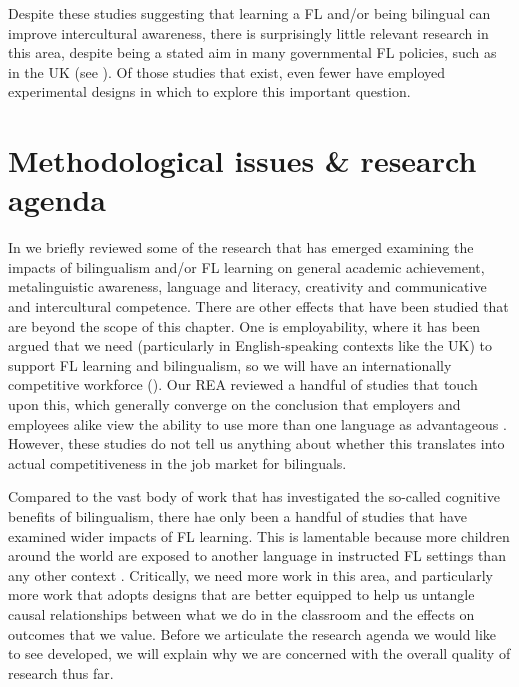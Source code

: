 \documentclass[output=paper]{langscibook}
\begin{document}
Despite these studies suggesting that learning a FL and/or being bilingual can improve intercultural awareness, there is surprisingly little relevant research in this area, despite being a stated aim in many governmental FL policies, such as in the UK (see \citealt{DfE2013curriculum}). Of those studies that exist, even fewer have employed experimental designs in which to explore this important question. 

\section{Methodological issues \& research agenda}

In  we briefly reviewed some of the research that has emerged examining the impacts of bilingualism and/or FL learning on general academic achievement, metalinguistic awareness, language and literacy, creativity and communicative and intercultural competence. There are other effects that have been studied that are beyond the scope of this chapter. One is employability, where it has been argued that we need (particularly in English-speaking contexts like the UK) to support FL learning and bilingualism, so we will have an internationally competitive workforce (\citealt{MitchellMyles2019}). Our REA reviewed a handful of studies that touch upon this, which generally converge on the conclusion that employers and employees alike view the ability to use more than one language as advantageous \citep{MurphyEtAl2020}. However, these studies do not tell us anything about whether this translates into actual competitiveness in the job market for bilinguals.

Compared to the vast body of work that has investigated the so-called cognitive benefits of bilingualism, there hae only been a handful of studies that have examined wider impacts of FL learning. This is lamentable because more children around the world are exposed to another language in instructed FL settings than any other context \citep{Murphy2014}. Critically, we need more work in this area, and particularly more work that adopts designs that are better equipped to help us untangle causal relationships between what we do in the classroom and the effects on outcomes that we value. Before we articulate the research agenda we would like to see developed, we will explain why we are concerned with the overall quality of research thus far.
\end{document}
